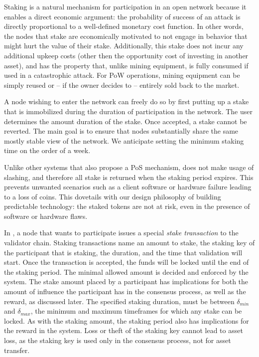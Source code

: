 \documentclass[runningheads]{llncs}
\begin{document}
Staking is a natural mechanism for participation in an open network because it enables a direct economic argument: the probability of success of an attack is directly proportional to a well-defined monetary cost function. In other words, the nodes that stake are economically motivated to not engage in behavior that might hurt the value of their stake. 
Additionally, this stake does not incur any additional upkeep costs (other then the opportunity cost of investing in another asset), and has the property that, unlike mining equipment, is fully consumed if used in a catastrophic attack. For PoW operations, mining equipment can be simply reused or -- if the owner decides to -- entirely sold back to the market.

A node wishing to enter the network can freely do so by first putting up a stake that is immobilized during the duration of participation in the network. The user determines the amount duration of the stake.
Once accepted, a stake cannot be reverted. 
The main goal is to ensure that nodes substantially share the same mostly stable view of the network. 
We anticipate setting the minimum staking time on the order of a week. 

Unlike other systems that also propose a PoS mechanism, \AVATokenName{} does not make usage of slashing, and therefore all stake is returned when the staking period expires. 
This prevents unwanted scenarios such as a client software or hardware failure leading to a loss of coins. 
This dovetails with our design philosophy of building predictable technology: the staked tokens are not at risk, even in the presence of software or hardware flaws.

In \AVAPlatformName{}, a node that wants to participate issues a special \emph{stake transaction} to the validator chain.
Staking transactions name an amount to stake, the staking key of the participant that is staking, the duration, and the time that validation will start. 
Once the transaction is accepted, the funds will be locked until the end of the staking period. The minimal allowed amount is decided and enforced by the system. 
The stake amount placed by a participant has implications for both the amount of influence the participant has in the consensus process, as well as the reward, as discussed later. 
The specified staking duration, must be between $\delta_{min}$ and $\delta_{max}$, the minimum and maximum timeframes for which any stake can be locked. 
As with the staking amount, the staking period also has implications for the reward in the system. 
Loss or theft of the staking key cannot lead to asset loss, as the staking key is used only in the consensus process, not for asset transfer.
\end{document}
